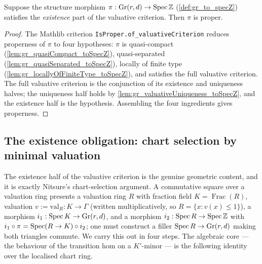 \begin{lemma}\leanok
  \label{lem:gr_isProper_of_valuativeExistence}
  Suppose the structure morphism \(\pi : \mathrm{Gr}(r,d) \to \operatorname{Spec} \mathbb{Z}\)
  (\cref{def:gr_to_specZ}) satisfies the \emph{existence} part of the valuative
  criterion. Then \(\pi\) is proper.
\end{lemma}
\begin{proof}
    \leanok
  The Mathlib criterion \texttt{IsProper.of\_valuativeCriterion} reduces properness
  of \(\pi\) to four hypotheses: \(\pi\) is quasi-compact
  (\cref{lem:gr_quasiCompact_toSpecZ}), quasi-separated
  (\cref{lem:gr_quasiSeparated_toSpecZ}), locally of finite type
  (\cref{lem:gr_locallyOfFiniteType_toSpecZ}), and satisfies the full valuative
  criterion. The full valuative criterion is the conjunction of its existence and
  uniqueness halves; the uniqueness half holds by
  \cref{lem:gr_valuativeUniqueness_toSpecZ}, and the existence half is the
  hypothesis. Assembling the four ingredients gives properness.
\end{proof}

\subsection*{The existence obligation: chart selection by minimal valuation}

The existence half of the valuative criterion is the genuine geometric content,
and it is exactly Nitsure's chart-selection argument. A commutative square over a
valuation ring presents a valuation ring \(R\) with fraction field \(K =
\operatorname{Frac}(R)\), valuation \(v := \mathrm{val}_R : K \to \Gamma\) (written
multiplicatively, so \(R = \{x : v(x) \le 1\}\)), a morphism \(i_1 : \operatorname{Spec} K \to
\mathrm{Gr}(r,d)\), and a morphism \(i_2 : \operatorname{Spec} R \to \operatorname{Spec} \mathbb{Z}\) with
\(i_1 \circ \pi = \operatorname{Spec}(R \to K) \circ i_2\); one must construct a filler
\(\operatorname{Spec} R \to \mathrm{Gr}(r,d)\) making both triangles commute. We carry this out
in four steps. The algebraic core --- the behaviour of the transition hom on a
\(K'\)-minor --- is the following identity over the localised chart ring.

